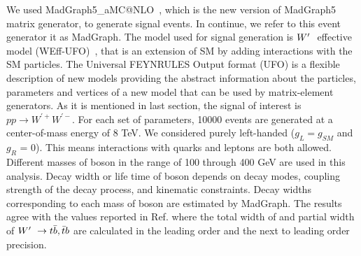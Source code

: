 We used MadGraph5\_aMC@NLO~\cite{Alwall:2014hca}, which is the new version of MadGraph5~\cite{Alwall:2011uj} matrix generator, to generate signal events. In continue, we refer to this event generator it as MadGraph.
The model used for signal generation is $W^\prime~$ effective model (WEff-UFO)~\cite{Sullivan:2002jt}, that is an extension of SM by adding \wprime interactions with the SM particles.
The Universal FEYNRULES\cite{Christensen:2008py} Output format (UFO) is a flexible description of new models providing the abstract information about the particles, parameters and vertices of a new model that can be used by matrix-element generators. 
As it is mentioned in last section, the signal of interest is $ pp\rightarrow W^{\prime+} W^{\prime-}$. 
For each set of parameters, 10000 events are generated at a center-of-mass energy of 8 TeV. We considered purely left-handed  \wprime ($ g_L = g_{SM}$ and $ g_R $ = 0). 
This means interactions with quarks and leptons are both allowed. Different masses of  \wprime boson in the range of 100 through 400 GeV are used in this analysis.  
Decay width or life time of \wprime boson depends on decay modes, coupling strength of the decay process, and kinematic constraints. Decay widths corresponding to each mass of \wprime boson are estimated  by MadGraph. The results agree with the values reported in Ref.\cite{Sullivan:2002jt} where the total width of \wprime and partial width of $W^\prime~ \rightarrow t \bar{b},\bar{t}b $ are calculated in the leading order and the next to leading order precision.
